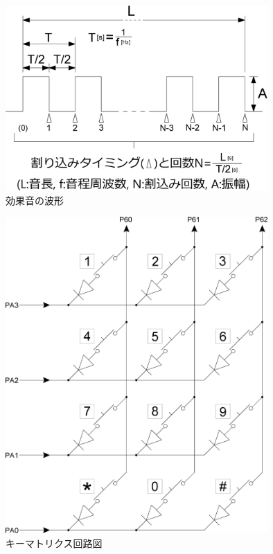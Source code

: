 ﻿\documentclass{jarticle}
\begin{document}
\begin{figure}[!h]
	\begin{center}
		\includegraphics[width=10cm]{./figure4.eps}
	\end{center}
	\caption{効果音の波形}
\end{figure}

\newpage







\fi

\newpage

\begin{figure}[h]
	\begin{center}
		\includegraphics[width=10cm]{./figure5.eps}
	\end{center}
	\caption{キーマトリクス回路図}
\end{figure}
\end{document}
